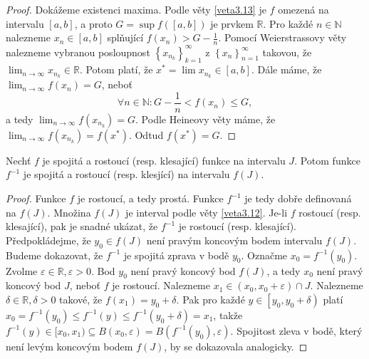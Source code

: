 \begin{proof}
	Dokážeme existenci maxima. Podle věty \ref{veta3.13} je $f$ omezená na intervalu $\left [ a,b \right ] $,
	a proto $G=\sup f(\left [ a,b \right ] )$ je prvkem $\mathbb R $. Pro každé $n\in \mathbb N $
	nalezneme $x_n \in \left [ a,b \right ] $ splňující $f(x_n)> G-\frac{1}{n}$. Pomocí Weierstrassovy
	věty nalezneme vybranou posloupnost $\left \{ x_{n_k} \right \}_{k=1}^\infty $ z
	$\left \{ x_n \right \}_{n=1}^\infty $ takovou, že $\lim_{n \to \infty} x_{n_k}\in \mathbb R $.
	Potom platí, že $x^* = \lim x_{n_k} \in \left [ a,b \right ] $. Dále máme, že
	$\lim_{n \to \infty} f(x_n)=G$, neboť
	$$
	    \forall n \in \mathbb N:G-\frac{1}{n} < f(x_n) \leq G,
	$$
	a tedy $\lim_{n \to \infty} f(x_{n_k})=G$. Podle Heineovy věty máme, že $\lim_{n \to \infty} f(x_{n_k})=f(x^*)$.
	Odtud $f(x^*)=G$.
\end{proof}

\begin{veta}\label{veta3.15} %
Nechť $f$ je spojitá a rostoucí (resp. klesající) funkce na intervalu $J$. Potom funkce
$f^{-1}$ je spojitá a rostoucí (resp. klesjící) na intervalu $f(J)$.
\end{veta}

\begin{proof}
	Funkce $f$ je rostoucí, a tedy prostá. Funkce $f^{-1}$ je tedy dobře definovaná na $f(J)$.
	Množina $f(J)$ je interval podle věty \ref{veta3.12}. Je-li $f$ rostoucí (resp. klesající),
	pak je snadné ukázat, že $f^{-1}$ je rostoucí (resp. klesající). Předpokládejme, že $y_0\in f(J)$
	není pravým koncovým bodem intervalu $f(J)$. Budeme dokazovat, že $f^{-1}$ je spojitá zprava
	v bodě $y_0$. Označme $x_0= f^{-1}(y_0)$. Zvolme $\varepsilon \in \mathbb R , \varepsilon > 0$.
	Bod $y_0$ není pravý koncový bod $f(J)$, a tedy $x_0$ není pravý koncový bod $J$, neboť $f$
	je rostoucí. Nalezneme $x_1\in (x_0,x_0+\varepsilon) \cap J$. Nalezneme $\delta \in \mathbb R , \delta > 0$
	takové, že $f(x_1)=y_0+ \delta$. Pak pro každé $y\in \left [ y_0,y_0+\delta \right ) $
	platí $x_0=f^{-1}(y_0)\leq f^{-1}(y)\leq f^{-1}(y_0+\delta)=x_1$, takže
	$f^{-1}(y) \in [x_0,x_1) \subseteq B(x_0,\varepsilon)= B(f^{-1}(y_0),\varepsilon)$. Spojitost
	zleva v bodě, který není levým koncovým bodem $f(J)$, by se dokazovala analogicky.
\end{proof}
